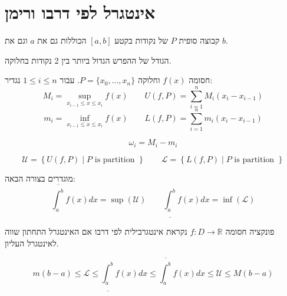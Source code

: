 \documentclass{tstextbook}
\begin{document}
\section{אינטגרל לפי דרבו ורימן}

\begin{definition}
קבוצה סופית \(P\) של נקודות בקטע \([a,b]\) הכוללות גם את \(a\) וגם את \(b\).

\end{definition}
\begin{definition}
הגודל של ההפרש הגדול ביותר בין 2 נקודות בחלוקה.

\end{definition}
\begin{definition}
חסומה \(f(x)\) וחלוקה \(P=\{x_0, ... , x_n\}\). עבור \(1\leq i\leq n\) נגדיר:
$$M_i = \underset{x_{i-1}\leq x\leq x_i}{\sup}f(x)\qquad U(f,P)=\sum_{i=1}^{n} M_i (x_i - x_{i-1})$$$$m_i = \underset{x_{i-1}\leq x\leq x_i}{\inf}f(x)\qquad L(f,P)=\sum_{i=1}^{n} m_i (x_i - x_{i-1}) $$

\end{definition}
\begin{definition}
$$\omega_i = M_i - m_i$$

\end{definition}
\begin{definition}
$$\mathcal{U} = \left\{U(f,P) \mid P \text{ is partition } \right\}\qquad \mathcal{L} = \left\{L(f,P) \mid P \text{ is partition } \right\}$$

\end{definition}
\begin{definition}
מוגדרים בצורה הבאה:
$$\overline{\int_a^b} f(x) dx = \sup(\mathcal{U})\qquad \underline{\int_a^b} f(x)dx=\inf(\mathcal{L})$$

\end{definition}
\begin{definition}
פונקציה חסומה \(f:D\to \mathbb{R}\) נקראת אינטגרבילית לפי דרבו אם האינטגרל התחתון שווה לאינטגרל העליון.

\end{definition}
\begin{proposition}
$$m(b-a)\leq \mathcal{L}\leq \underline{\int_a^b} f(x)dx \leq \overline{\int_a^b} f(x) dx \leq \mathcal{U}\leq M(b-a)$$

\end{proposition}
\end{document}
